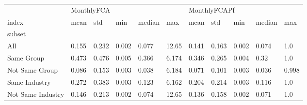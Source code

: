 \begin{tabular}{lllllllllll}
\toprule
 & \multicolumn{5}{l}{MonthlyFCA} & \multicolumn{5}{l}{MonthlyFCAPf} \\
index &       mean &    std &    min & median &    max &         mean &    std &    min & median &    max \\
subset            &            &        &        &        &        &              &        &        &        &        \\
\midrule
All               &      0.155 &  0.232 &  0.002 &  0.077 &  12.65 &        0.141 &  0.163 &  0.002 &  0.074 &    1.0 \\
Same Group        &      0.473 &  0.476 &  0.005 &  0.366 &  6.174 &        0.346 &  0.265 &  0.004 &   0.32 &    1.0 \\
Not Same Group    &      0.086 &  0.153 &  0.003 &  0.038 &  6.184 &        0.071 &  0.101 &  0.003 &  0.036 &  0.998 \\
Same Industry     &      0.272 &  0.383 &  0.003 &  0.123 &  6.162 &        0.204 &  0.214 &  0.003 &  0.116 &    1.0 \\
Not Same Industry &      0.146 &  0.213 &  0.002 &  0.074 &  12.65 &        0.136 &  0.158 &  0.002 &  0.071 &    1.0 \\
\bottomrule
\end{tabular}
